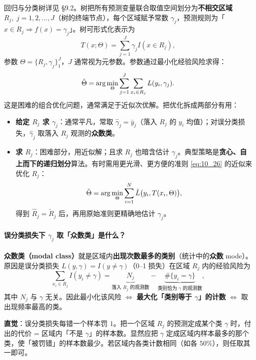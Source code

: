 回归与分类树详见 §9.2。树把所有预测变量联合取值空间划分为\textbf{不相交区域} $R_j,\; j = 1, 2, \ldots, J$（树的终端节点），每个区域赋予常数 $\gamma_j$，预测规则为「$x \in R_j \Rightarrow f(x) = \gamma_j$」。树可形式化表示为
\begin{equation}\label{eq:10_25}
    T(x; \Theta) = \sum_{j=1}^{J} \gamma_j I(x \in R_j),
\end{equation}
参数 $\Theta = \{R_j, \gamma_j\}_1^J$，$J$ 通常视为元参数。参数通过最小化经验风险求得：
\begin{equation}\label{eq:10_26}
    \hat\Theta = \arg\min_{\Theta} \sum_{j=1}^{J} \sum_{x_i \in R_j} L(y_i, \gamma_j).
\end{equation}
这是困难的组合优化问题，通常满足于近似次优解。把优化拆成两部分有用：
\begin{itemize}
    \item \textbf{给定 $R_j$ 求 $\gamma_j$}：通常平凡，常取 $\hat\gamma_j = \bar y_j$（落入 $R_j$ 的 $y_i$ 均值）；对误分类损失，$\hat\gamma_j$ 取落入 $R_j$ 观测的\textbf{众数类}。
    \item \textbf{求 $R_j$}：困难部分，用近似解；且求 $R_j$ 也暗含估计 $\gamma_j$。典型策略是\textbf{贪心、自上而下的递归划分}算法。有时需用更光滑、更方便的准则 \eqref{eq:10_26} 的近似来优化 $R_j$：
    \begin{equation}\label{eq:10_27}
        \tilde\Theta = \arg\min_{\Theta} \sum_{i=1}^{N} \tilde L\bigl(y_i, T(x_i, \Theta)\bigr),
    \end{equation}
    得到 $\hat R_j = \tilde R_j$ 后，再用原始准则更精确地估计 $\gamma_j$。
\end{itemize}

\paragraph{误分类损失下 $\hat\gamma_j$ 取「众数类」是什么？}

\textbf{众数类（modal class）}就是区域内\textbf{出现次数最多的类别}（统计中的\textbf{众数} mode）。原因是误分类损失 $L(y, \gamma) = I(y \neq \gamma)$（0--1 损失）在区域 $R_j$ 内的经验风险为
\[
    \sum_{x_i \in R_j} I(y_i \neq \gamma) = \underbrace{N_j}_{\text{落入 }R_j\text{ 的观测数}} - \underbrace{\#\{y_i = \gamma\}}_{\text{类别恰为 }\gamma\text{ 的观测数}},
\]
其中 $N_j$ 与 $\gamma$ 无关。因此最小化该风险 $\iff$ \textbf{最大化「类别等于 $\gamma$」的计数} $\iff$ 取出现频率最高的类。

\textbf{直觉}：误分类损失每错一个样本罚 $1$。把一个区域 $R_j$ 的预测定成某个类 $\gamma$ 时，付出的代价 = 区域内「不是 $\gamma$」的样本数。显然应把 $\gamma$ 定成区域内样本最多的那个类，使「被罚错」的样本数最少。若区域内各类计数相同（如各 $50\%$），则任取其一即可。

